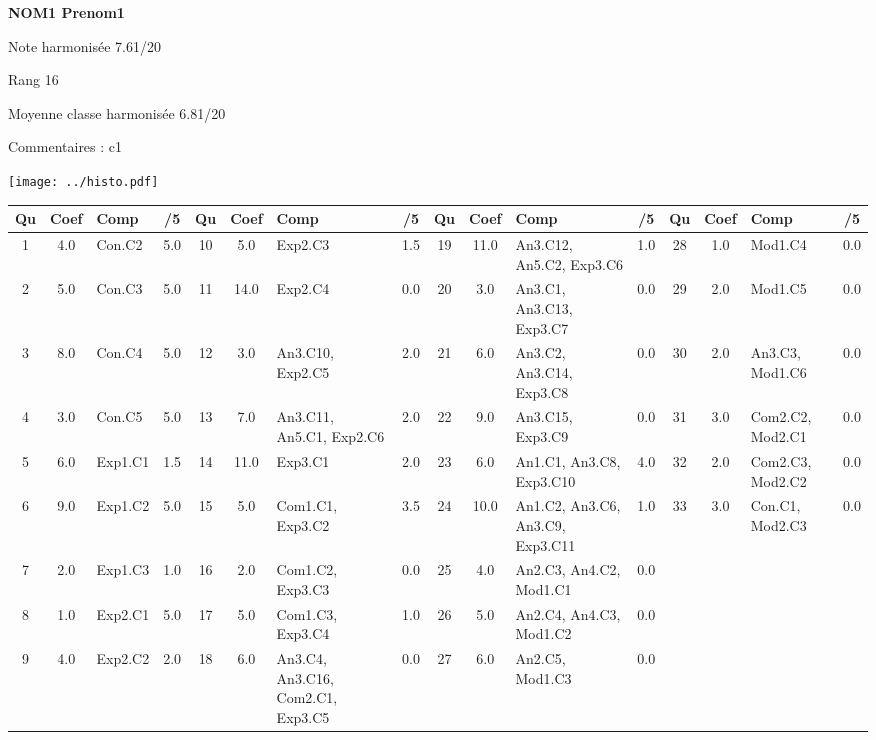 \begin{minipage}[c]{.45\linewidth} 
\Large \textbf{\textsf{NOM1 Prenom1}} 
 
 \normalsize Note harmonisée 7.61/20 
 
Rang 16
 
Moyenne classe harmonisée 6.81/20 
 
Commentaires : 
c1 
\end{minipage}\hfill 
\begin{minipage}[c]{.45\linewidth}  
\begin{center}
\texttt{[image: ../histo.pdf]} 
\end{center}
\end{minipage}
\footnotesize 
\begin{center} 
\begin{tabular}{|c|c|m{1cm}|c||c|c|m{1cm}|c||c|c|m{1cm}|c||c|c|m{1cm}|c|} 
\hline \textbf{Qu} & \textbf{Coef} & \textbf{Comp} & \textbf{/5} & \textbf{Qu} & \textbf{Coef} & \textbf{Comp} & \textbf{/5} & \textbf{Qu} & \textbf{Coef} & \textbf{Comp} & \textbf{/5} & \textbf{Qu} & \textbf{Coef} & \textbf{Comp} & \textbf{/5} \\ 
\hline 
\hline 
1 & 4.0 & Con.C2 & 5.0 & 10 & 5.0 & Exp2.C3 & 1.5 & 19 & 11.0 & An3.C12, An5.C2, Exp3.C6 & 1.0 & 28 & 1.0 & Mod1.C4 & 0.0 \\ \hline 
2 & 5.0 & Con.C3 & 5.0 & 11 & 14.0 & Exp2.C4 & 0.0 & 20 & 3.0 & An3.C1, An3.C13, Exp3.C7 & 0.0 & 29 & 2.0 & Mod1.C5 & 0.0 \\ \hline 
3 & 8.0 & Con.C4 & 5.0 & 12 & 3.0 & An3.C10, Exp2.C5 & 2.0 & 21 & 6.0 & An3.C2, An3.C14, Exp3.C8 & 0.0 & 30 & 2.0 & An3.C3, Mod1.C6 & 0.0 \\ \hline 
4 & 3.0 & Con.C5 & 5.0 & 13 & 7.0 & An3.C11, An5.C1, Exp2.C6 & 2.0 & 22 & 9.0 & An3.C15, Exp3.C9 & 0.0 & 31 & 3.0 & Com2.C2, Mod2.C1 & 0.0 \\ \hline 
5 & 6.0 & Exp1.C1 & 1.5 & 14 & 11.0 & Exp3.C1 & 2.0 & 23 & 6.0 & An1.C1, An3.C8, Exp3.C10 & 4.0 & 32 & 2.0 & Com2.C3, Mod2.C2 & 0.0 \\ \hline 
6 & 9.0 & Exp1.C2 & 5.0 & 15 & 5.0 & Com1.C1, Exp3.C2 & 3.5 & 24 & 10.0 & An1.C2, An3.C6, An3.C9, Exp3.C11 & 1.0 & 33 & 3.0 & Con.C1, Mod2.C3 & 0.0 \\ \hline 
7 & 2.0 & Exp1.C3 & 1.0 & 16 & 2.0 & Com1.C2, Exp3.C3 & 0.0 & 25 & 4.0 & An2.C3, An4.C2, Mod1.C1 & 0.0 &  &  &  &  \\ \hline 

8 & 1.0 & Exp2.C1 & 5.0 & 17 & 5.0 & Com1.C3, Exp3.C4 & 1.0 & 26 & 5.0 & An2.C4, An4.C3, Mod1.C2 & 0.0 &  &  &  &  \\ \hline 

9 & 4.0 & Exp2.C2 & 2.0 & 18 & 6.0 & An3.C4, An3.C16, Com2.C1, Exp3.C5 & 0.0 & 27 & 6.0 & An2.C5, Mod1.C3 & 0.0 &  &  &  &  \\ \hline 

\end{tabular} 
\end{center} 
\normalsize 
 
